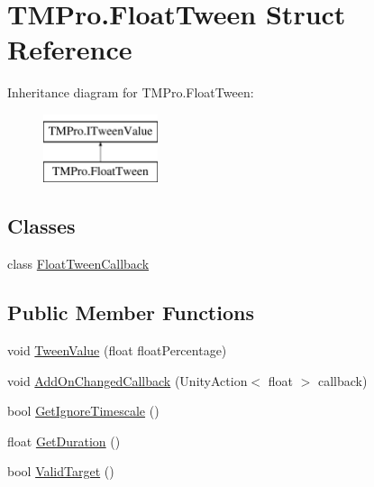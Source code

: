 \hypertarget{struct_t_m_pro_1_1_float_tween}{}\section{T\+M\+Pro.\+Float\+Tween Struct Reference}
\label{struct_t_m_pro_1_1_float_tween}
Inheritance diagram for T\+M\+Pro.\+Float\+Tween\+:\begin{figure}[H]
\begin{center}
\leavevmode
\includegraphics[height=2.000000cm]{struct_t_m_pro_1_1_float_tween}
\end{center}
\end{figure}
\subsection*{Classes}
\begin{DoxyCompactItemize}
\item 
class \mbox{\hyperlink{class_t_m_pro_1_1_float_tween_1_1_float_tween_callback}{Float\+Tween\+Callback}}
\end{DoxyCompactItemize}
\subsection*{Public Member Functions}
\begin{DoxyCompactItemize}
\item 
void \mbox{\hyperlink{struct_t_m_pro_1_1_float_tween_ae58254bf8799dddc55990ec1f0082c6d}{Tween\+Value}} (float float\+Percentage)
\item 
void \mbox{\hyperlink{struct_t_m_pro_1_1_float_tween_ab85f7b9e878c92af531dbb2a84b2fee6}{Add\+On\+Changed\+Callback}} (Unity\+Action$<$ float $>$ callback)
\item 
bool \mbox{\hyperlink{struct_t_m_pro_1_1_float_tween_a01d7fe80680ceafebda7a94c0f59f8bf}{Get\+Ignore\+Timescale}} ()
\item 
float \mbox{\hyperlink{struct_t_m_pro_1_1_float_tween_a4a7ba395bbd92d2dbfb57b305a71944d}{Get\+Duration}} ()
\item 
bool \mbox{\hyperlink{struct_t_m_pro_1_1_float_tween_a3d09fd870431b55a0632db8da6356ee1}{Valid\+Target}} ()
\end{DoxyCompactItemize}
